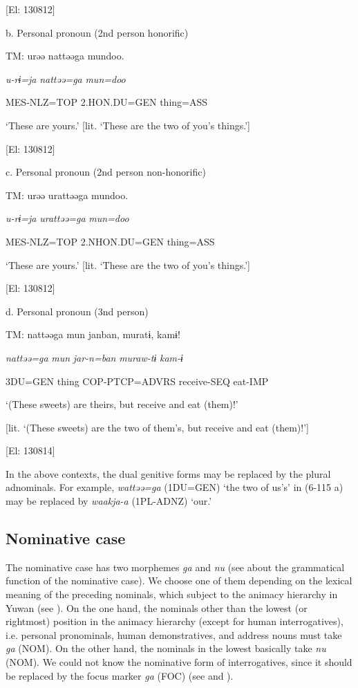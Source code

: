       [El: 130812]

  b.  Personal pronoun (2nd person honorific)

    TM:  urəə  nattəəga  mundoo.

      \textit{u-rɨ=ja}  \textit{nattəə=ga}  \textit{mun=doo}

      MES-NLZ=TOP  2.HON.DU=GEN  thing=ASS

      ‘These are yours.’ [lit. ‘These are the two of you’s things.’]

      [El: 130812]

  c.  Personal pronoun (2nd person non-honorific)

    TM:  urəə  urattəəga  mundoo.

      \textit{u-rɨ=ja}  \textit{urattəə=ga}  \textit{mun=doo}

      MES-NLZ=TOP  2.NHON.DU=GEN  thing=ASS

      ‘These are yours.’ [lit. ‘These are the two of you’s things.’]

      [El: 130812]

  d.  Personal pronoun (3nd person)

    TM:  nattəəga  mun  janban,  muratɨ,  kamɨ!

      \textit{nattəə=ga}  \textit{mun}  \textit{jar-n=ban}  \textit{muraw-tɨ}  \textit{kam-ɨ}

      3DU=GEN  thing  COP-PTCP=ADVRS  receive-SEQ  eat-IMP

      ‘(These sweets) are theirs, but receive and eat (them)!’

[lit. ‘(These sweets) are the two of them’s, but receive and eat (them)!’]

      [El: 130814]

In the above contexts, the dual genitive forms may be replaced by the plural adnominals. For example, \textit{wattəə=ga} (1DU=GEN) ‘the two of us’s’ in (6-115 a) may be replaced by \textit{waakja-a} (1PL-ADNZ) ‘our.’

\subsection{Nominative case}

The nominative case has two morphemes \textit{ga} and \textit{nu} (see  about the grammatical function of the nominative case). We choose one of them depending on the lexical meaning of the preceding nominals, which subject to the animacy hierarchy in Yuwan (see ). On the one hand, the nominals other than the lowest (or rightmost) position in the animacy hierarchy (except for human interrogatives), i.e. personal pronominals, human demonstratives, and address nouns must take \textit{ga} (NOM). On the other hand, the nominals in the lowest basically take \textit{nu} (NOM). We could not know the nominative form of interrogatives, since it should be replaced by the focus marker \textit{ga} (FOC) (see  and ).

